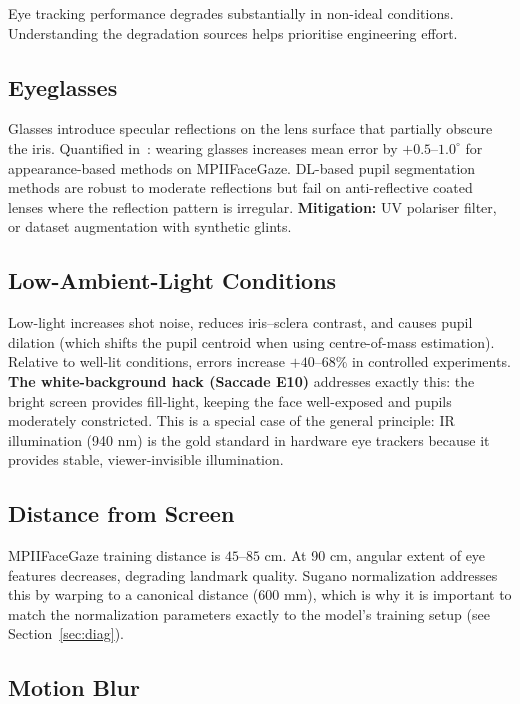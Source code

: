\documentclass[11pt,a4paper]{article}
\begin{document}
Eye tracking performance degrades substantially in non-ideal conditions.
Understanding the degradation sources helps prioritise engineering effort.

\subsection{Eyeglasses}

Glasses introduce specular reflections on the lens surface that partially obscure the iris.
Quantified in~\cite{zhang2019mpiigaze}: wearing glasses increases mean error by
$+0.5$--$1.0^\circ$ for appearance-based methods on MPIIFaceGaze.
DL-based pupil segmentation methods are robust to moderate reflections but fail on
anti-reflective coated lenses where the reflection pattern is irregular.
\textbf{Mitigation:} UV polariser filter, or dataset augmentation with synthetic glints.

\subsection{Low-Ambient-Light Conditions}

Low-light increases shot noise, reduces iris--sclera contrast, and causes pupil dilation
(which shifts the pupil centroid when using centre-of-mass estimation).
Relative to well-lit conditions, errors increase $+40$--$68\%$ in controlled experiments.
\textbf{The white-background hack (Saccade E10)} addresses exactly this: the bright screen
provides fill-light, keeping the face well-exposed and pupils moderately constricted.
This is a special case of the general principle: IR illumination (940 nm) is the gold
standard in hardware eye trackers because it provides stable, viewer-invisible illumination.

\subsection{Distance from Screen}

MPIIFaceGaze training distance is $45$--$85$ cm.
At 90 cm, angular extent of eye features decreases, degrading landmark quality.
Sugano normalization addresses this by warping to a canonical distance (600 mm),
which is why it is important to match the normalization parameters exactly to the model's
training setup (see Section~\ref{sec:diag}).

\subsection{Motion Blur}
\end{document}
